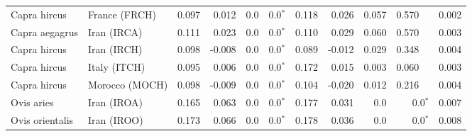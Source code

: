 \begin{center}
\begin{adjustbox}{width = 1\textwidth}
\begin{tabular}{|l|l|r|r|r|r|r|r|r|r|r|}
        Capra hircus &                   France (FRCH) &                 0.097 &                                0.012 &                  0.0 &                             0.0$\bm{^*}$ &                 0.118 &                                0.026 &                0.057 &                                  0.570~~ &              0.002 \\
      Capra aegagrus &                     Iran (IRCA) &                 0.111 &                                0.023 &                  0.0 &                             0.0$\bm{^*}$ &                 0.110 &                                0.029 &                0.060 &                                  0.570~~ &              0.003 \\
        Capra hircus &                     Iran (IRCH) &                 0.098 &                               -0.008 &                  0.0 &                             0.0$\bm{^*}$ &                 0.089 &                               -0.012 &                0.029 &                                  0.348~~ &              0.004 \\
        Capra hircus &                    Italy (ITCH) &                 0.095 &                                0.006 &                  0.0 &                             0.0$\bm{^*}$ &                 0.172 &                                0.015 &                0.003 &                                  0.060~~ &              0.003 \\
        Capra hircus &                  Morocco (MOCH) &                 0.098 &                               -0.009 &                  0.0 &                             0.0$\bm{^*}$ &                 0.104 &                               -0.020 &                0.012 &                                  0.216~~ &              0.004 \\
          Ovis aries &                     Iran (IROA) &                 0.165 &                                0.063 &                  0.0 &                             0.0$\bm{^*}$ &                 0.177 &                                0.031 &                  0.0 &                             0.0$\bm{^*}$ &              0.007 \\
     Ovis orientalis &                     Iran (IROO) &                 0.173 &                                0.066 &                  0.0 &                             0.0$\bm{^*}$ &                 0.178 &                                0.036 &                  0.0 &                             0.0$\bm{^*}$ &              0.008 \\

\end{tabular}
\end{adjustbox}
\end{center}
